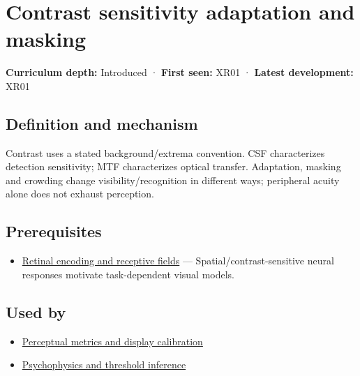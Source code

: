 \hypertarget{appendix-b3aa9e8e01ad}{}\label{referencestart:appendix-b3aa9e8e01ad}
\section{Contrast sensitivity adaptation and masking}\label{appendix-b3aa9e8e01ad-contrast-sensitivity-adaptation-and-masking}

\textbf{Curriculum depth:} Introduced · \textbf{First seen:} XR01 · \textbf{Latest development:} XR01

\begin{allmightroledefinition}

\subsection{Definition and mechanism}\label{appendix-b3aa9e8e01ad-definition-and-mechanism}

Contrast uses a stated background/extrema convention. CSF characterizes detection sensitivity; MTF characterizes optical transfer. Adaptation, masking and crowding change visibility/recognition in different ways; peripheral acuity alone does not exhaust perception.

\end{allmightroledefinition}

\subsection{Prerequisites}\label{appendix-b3aa9e8e01ad-prerequisites}

\begin{itemize}
\tightlist
\item
  \hyperref[appendix-7281c15ac44a]{Retinal encoding and receptive fields} --- Spatial/contrast-sensitive neural responses motivate task-dependent visual models.
\end{itemize}

\subsection{Used by}\label{appendix-b3aa9e8e01ad-used-by}

\begin{itemize}
\tightlist
\item
  \hyperref[appendix-b2c1846508bf]{Perceptual metrics and display calibration}
\item
  \hyperref[appendix-1759f03e8ce7]{Psychophysics and threshold inference}
\end{itemize}

